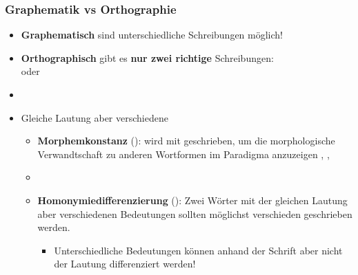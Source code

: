 \begin{frame}
\frametitle{Graphematik vs Orthographie}

\begin{itemize}
	\item \textbf{Graphematisch} sind unterschiedliche Schreibungen möglich!
	\item \textbf{Orthographisch} gibt es \textbf{nur zwei richtige} Schreibungen: \\
	 oder 
	\item[]
	\item Gleiche Lautung aber verschiedene 
	
	\begin{itemize}
		\item \textbf{Morphemkonstanz} (\su):  wird mit  geschrieben, um die morphologische Verwandtschaft zu anderen Wortformen im Paradigma anzuzeigen \ras {}, , 
		\item[]		
		\item \textbf{Homonymiedifferenzierung} (\su): Zwei Wörter mit der gleichen Lautung aber verschiedenen Bedeutungen sollten möglichst verschieden geschrieben werden.
		
		\begin{itemize}
			\item Unterschiedliche Bedeutungen können anhand der Schrift aber nicht der Lautung differenziert werden!
		\end{itemize}
	\end{itemize}
\end{itemize}


\end{frame}



